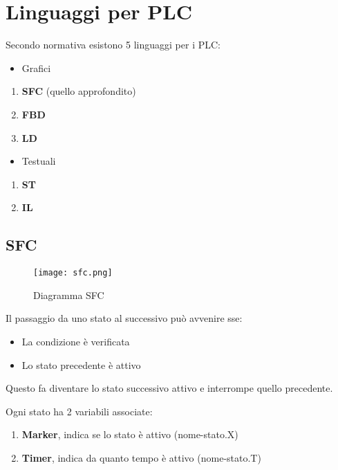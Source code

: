 \documentclass{article}
\begin{document}
\newpage

\section{Linguaggi per PLC}

Secondo normativa esistono 5 linguaggi per i PLC:
\begin{itemize}
    \item Grafici
\end{itemize}
\begin{enumerate}
    \item \textbf{SFC} (quello approfondito)
    \item \textbf{FBD}
    \item \textbf{LD}
\end{enumerate}
\begin{itemize}
    \item Testuali
\end{itemize}
\begin{enumerate}
    \item \textbf{ST}
    \item \textbf{IL}\newline
\end{enumerate}

\subsection{SFC}

\begin{figure}[ht]
    \centering
    \texttt{[image: sfc.png]}
    \caption{Diagramma SFC}
\end{figure}

\noindent Il passaggio da uno stato al successivo può avvenire sse:
\begin{itemize}
    \item La condizione è verificata
    \item Lo stato precedente è attivo
\end{itemize}

\noindent Questo fa diventare lo stato successivo attivo e interrompe quello precedente.\newline

\noindent Ogni stato ha 2 variabili associate:
\begin{enumerate}
    \item \textbf{Marker}, indica se lo stato è attivo (nome-stato.X)
    \item \textbf{Timer}, indica da quanto tempo è attivo (nome-stato.T)\newline
\end{enumerate}
\end{document}
